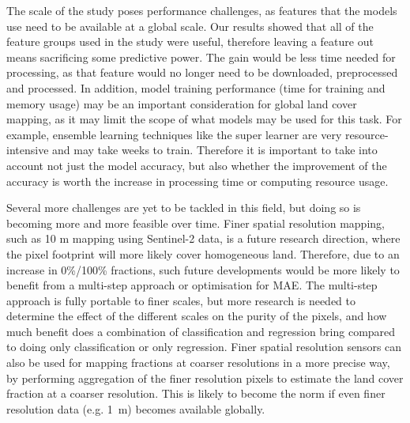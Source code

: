 \documentclass[review,authoryear,3p]{elsarticle}
\begin{document}
The scale of the study poses performance challenges, as features that the models use need to be available at a global scale.
Our results showed that all of the feature groups used in the study were useful, therefore leaving a feature out means sacrificing some predictive power.
The gain would be less time needed for processing, as that feature would no longer need to be downloaded, preprocessed and processed.
In addition, model training performance (time for training and memory usage) may be an important consideration for global land cover mapping, as it may limit the scope of what models may be used for this task.
For example, ensemble learning techniques like the super learner are very resource-intensive and may take weeks to train.
Therefore it is important to take into account not just the model accuracy, but also whether the improvement of the accuracy is worth the increase in processing time or computing resource usage.

Several more challenges are yet to be tackled in this field, but doing so is becoming more and more feasible over time.
%
Finer spatial resolution mapping, such as 10 m mapping using Sentinel-2 data, is a future research direction, where the pixel footprint will more likely cover homogeneous land.
Therefore, due to an increase in 0\%/100\% fractions, such future developments would be more likely to benefit from a multi-step approach or optimisation for \gls{MAE}.
The multi-step approach is fully portable to finer scales, but more research is needed to determine the effect of the different scales on the purity of the pixels, and how much benefit does a combination of classification and regression bring compared to doing only classification or only regression.
Finer spatial resolution sensors can also be used for mapping fractions at coarser resolutions in a more precise way, by performing aggregation of the finer resolution pixels to estimate the land cover fraction at a coarser resolution.
This is likely to become the norm if even finer resolution data (e.g. 1~m) becomes available globally.
\end{document}
